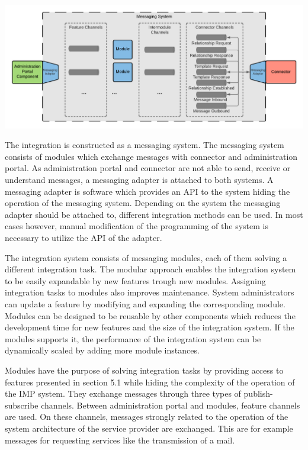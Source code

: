 \begin{center}
    \includegraphics[scale=0.6]{Diagrams/Integration Architecture 1/Technological Integration/4. Messaging Overview.pdf}
\end{center}

The integration is constructed as a messaging system. The messaging system consists of modules which exchange messages with connector and administration portal. As administration portal and connector are not able to send, receive or understand messages, a messaging adapter is attached to both systems. A messaging adapter is software which provides an API to the system hiding the operation of the messaging system. Depending on the system the messaging adapter should be attached to, different integration methods can be used. In most cases however, manual modification of the programming of the system is necessary to utilize the API of the adapter.

The integration system consists of messaging modules, each of them solving a different integration task. The modular approach enables the integration system to be easily expandable by new features trough new modules. Assigning integration tasks to modules also improves maintenance. System administrators can update a feature by modifying and expanding the corresponding module.
Modules can be designed to be reusable by other components which reduces the development time for new features and the size of the integration system. If the modules supports it, the performance of the integration system can be dynamically scaled by adding more module instances.

Modules have the purpose of solving integration tasks by providing access to features presented in section 5.1 while hiding the complexity of the operation of the IMP system. They exchange messages through three types of publish-subscribe channels. Between administration portal and modules, feature channels are used. On these channels, messages strongly related to the operation of the system architecture of the service provider are exchanged. This are for example messages for requesting services like the transmission of a mail.

